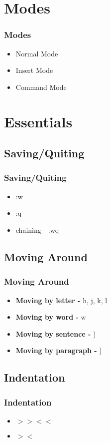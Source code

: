 \documentclass{beamer}
\begin{document}
\section{Modes}
\frame
{
    \frametitle{Modes}

    \begin{itemize}
        \item Normal Mode
        \item Insert Mode
        \item Command Mode
    \end{itemize}
}

\section{Essentials}
\subsection{Saving/Quiting}
\frame
{
    \frametitle{Saving/Quiting}

    \begin{itemize}
        \item :w
        \item :q
        \item chaining - :wq
    \end{itemize}
}
\subsection{Moving Around}
\frame
{
    \frametitle{Moving Around}

    \begin{itemize}
        \item \textbf{Moving by letter -} h, j, k, l
        \item \textbf{Moving by word -} w
        \item \textbf{Moving by sentence -} )
        \item \textbf{Moving by paragraph -} ]
    \end{itemize}
}

\subsection{Indentation}
\frame
{
    \frametitle{Indentation}

    \begin{itemize}
        \item $>> <<$
        \item $> <$
    \end{itemize}
}
\end{document}

